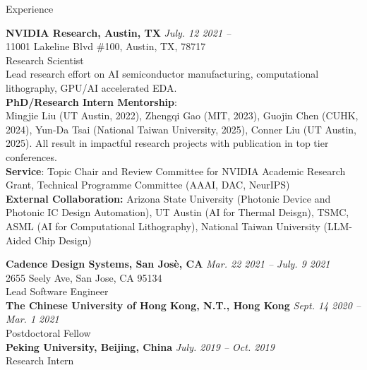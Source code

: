 
\begin{rSection}{Experience}

{\bf NVIDIA Research, Austin, TX}         \hfill {\em July. 12 2021 -- } \\
11001 Lakeline Blvd \#100, Austin, TX, 78717 \\
Research Scientist \\
Lead research effort on AI semiconductor manufacturing, computational lithography, GPU/AI accelerated EDA. \\
\textbf{PhD/Research Intern Mentorship}:\\
 Mingjie Liu (UT Austin, 2022), Zhengqi Gao (MIT, 2023), Guojin Chen (CUHK, 2024), Yun-Da Tsai (National Taiwan University, 2025), Conner Liu (UT Austin, 2025).
 All result in impactful research projects with publication in top tier conferences.\\
\textbf{Service}: Topic Chair and Review Committee for NVIDIA Academic Research Grant, Technical Programme Committee (AAAI, DAC, NeurIPS) \\
\textbf{External Collaboration:} Arizona State University (Photonic Device and Photonic IC Design Automation), UT Austin (AI for Thermal Deisgn), TSMC, ASML (AI for Computational Lithography), National Taiwan University (LLM-Aided Chip Design)
	
{\bf Cadence Design Systems, San Jos\`{e}, CA}         \hfill {\em Mar. 22 2021 -- July. 9 2021 } \\
2655 Seely Ave, San Jose, CA 95134 \\
Lead Software Engineer \\
	
{\bf The Chinese University of Hong Kong, N.T., Hong Kong}         \hfill {\em Sept. 14 2020 -- Mar. 1 2021} \\
Postdoctoral Fellow \\

{\bf Peking University, Beijing, China}         \hfill {\em July. 2019 -- Oct. 2019} \\
Research Intern


\end{rSection}

